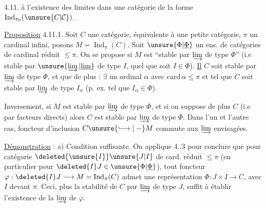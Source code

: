 \noindent\vrule\hspace{0.5em}\parbox{0.93\linewidth}{4.11.  à l'existence des limites dans une catégorie de la forme $\operatorname{Ind}_{\pi_0}(\unsure{C|\mathcal C})$.}

\uline{Proposition} 4.11.1.  Soit
$C$ une catégorie, équivalente à une petite catégorie, $\pi$ un cardinal infini, posons $M=\operatorname{Ind}_\pi(C)$. Soit $\unsure{\Phi|\underline{\Phi}}$ un ens. de catégories de cardinal réduit $\leq\pi$. On se propose  si $M$ est ``stable par $\varinjlim$ de type $\Phi$'' (i.e stable par $\unsure{\varinjlim|\underline{\lim}}$ de type $I$, quel que soit $I\in\Phi$). \uline{Il}    $C$ soit stable par $\varinjlim$ de type $\Phi$, et que de plus :  $\exists$ un ordinal  $\alpha$ avec $\mathrm{card}\,\alpha\leq\pi$ et tel que $C$ soit stable par $\varinjlim$ de type $I_\alpha$ (p. ex. tel que $I_\alpha\in\Phi$).

 Inversement, si $M$ est stable par $\varinjlim$ de type $\Phi$, et si on suppose de plus $C$  (i.e   par facteurs directs) alors $C$ est stable par $\varinjlim$ de type $\Phi$.  Dans l'un et l'autre cas,  foncteur d'inclusion $C\unsure{\lhook\joinrel\longrightarrow|\mathrel{-}}M$ commute aux $\varinjlim$ envisagées.

\uline{Démonstration} :  a) Condition suffisante. On applique 4..3 pour conclure que
pour  catégorie $\deleted{\unsure{I}}\unsure{J|I}$ de card. réduit $\leq\pi$ (en particulier pour $\deleted{I}J\in\unsure{\Phi|\underline{\Phi}}$), tout foncteur $\varphi:\deleted{I}J\longrightarrow M=\operatorname{Ind}_\pi(C)$ admet une représentation  $\Phi:J\times I\longrightarrow C$, avec $I$  devant $\pi$. Ceci,  plus la stabilité de $C$ par $\varinjlim$ de type $J$, suffit à établir l'existence de la $\varinjlim$ de $\varphi$.

